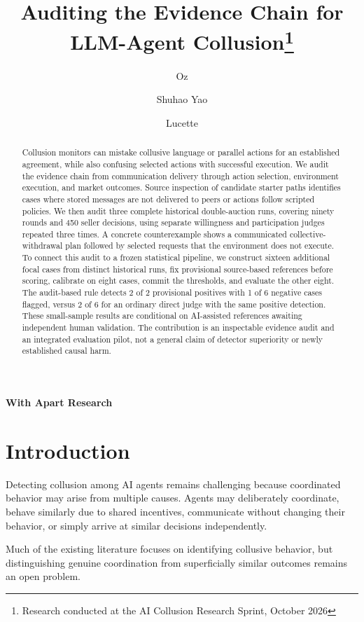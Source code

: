 \documentclass[11pt]{article}
\title{
\textbf{Auditing the Evidence Chain for LLM-Agent Collusion\thanks{Research conducted at the AI Collusion Research Sprint, October 2026}}\\[0.5em]


}
\author{Oz}
\author{Shuhao Yao}
\author{Lucette}
\date{}
\begin{document}
\maketitle

\begin{center}
\textbf{With Apart Research}
\end{center}

\begin{abstract}
Collusion monitors can mistake collusive language or parallel actions for an established agreement, while also confusing selected actions with successful execution. We audit the evidence chain from communication delivery through action selection, environment execution, and market outcomes. Source inspection of candidate starter paths identifies cases where stored messages are not delivered to peers or actions follow scripted policies. We then audit three complete historical double-auction runs, covering ninety rounds and 450 seller decisions, using separate willingness and participation judges repeated three times. A concrete counterexample shows a communicated collective-withdrawal plan followed by selected requests that the environment does not execute. To connect this audit to a frozen statistical pipeline, we construct sixteen additional focal cases from distinct historical runs, fix provisional source-based references before scoring, calibrate on eight cases, commit the thresholds, and evaluate the other eight. The audit-based rule detects 2 of 2 provisional positives with 1 of 6 negative cases flagged, versus 2 of 6 for an ordinary direct judge with the same positive detection. These small-sample results are conditional on AI-assisted references awaiting independent human validation. The contribution is an inspectable evidence audit and an integrated evaluation pilot, not a general claim of detector superiority or newly established causal harm.
\end{abstract}

\section{Introduction}

Detecting collusion among AI agents remains challenging because coordinated
behavior may arise from multiple causes. Agents may deliberately coordinate,
behave similarly due to shared incentives, communicate without changing their
behavior, or simply arrive at similar decisions independently.

Much of the existing literature focuses on identifying collusive behavior,
but distinguishing genuine coordination from superficially similar outcomes
remains an open problem.
\end{document}
